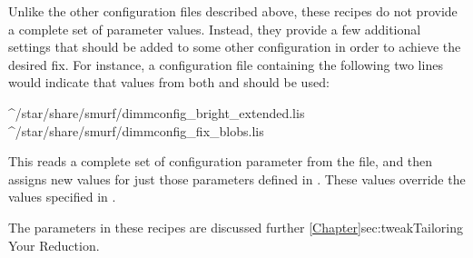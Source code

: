 Unlike the other configuration files described above, these recipes do not provide
a complete set of parameter values. Instead, they provide a few
additional settings that should be added to some other configuration in
order to achieve the desired fix. For instance, a configuration file
containing the following two lines would indicate that values from both
 and  should
be used:

\begin{terminalv}
^/star/share/smurf/dimmconfig_bright_extended.lis
^/star/share/smurf/dimmconfig_fix_blobs.lis
\end{terminalv}

This reads a complete set of configuration parameter from the
 file, and then assigns new values for just
those parameters defined in . These values override
the values specified in .

The parameters in these recipes are discussed further
\cref{Chapter}{sec:tweak}{Tailoring Your Reduction}.



